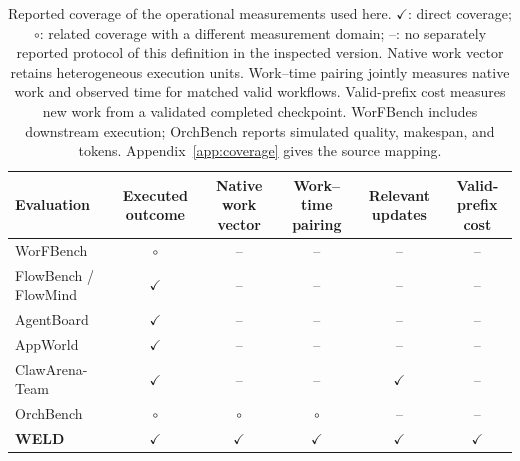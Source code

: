 \begin{table}[t]
\centering\small
\setlength{\tabcolsep}{3pt}
\begin{tabular}{lccccc}
\toprule
Evaluation & Executed outcome & Native work vector & Work--time pairing & Relevant updates & Valid-prefix cost\\
\midrule
WorFBench & $\circ$ & -- & -- & -- & --\\
FlowBench / FlowMind & $\checkmark$ & -- & -- & -- & --\\
AgentBoard & $\checkmark$ & -- & -- & -- & --\\
AppWorld & $\checkmark$ & -- & -- & -- & --\\
ClawArena-Team & $\checkmark$ & -- & -- & $\checkmark$ & --\\
OrchBench & $\circ$ & $\circ$ & $\circ$ & -- & --\\
\textbf{WELD} & $\checkmark$ & $\checkmark$ & $\checkmark$ & $\checkmark$ & $\checkmark$\\
\bottomrule
\end{tabular}
\caption{Reported coverage of the operational measurements used here. $\checkmark$: direct coverage; $\circ$: related coverage with a different measurement domain; --: no separately reported protocol of this definition in the inspected version. Native work vector retains heterogeneous execution units. Work--time pairing jointly measures native work and observed time for matched valid workflows. Valid-prefix cost measures new work from a validated completed checkpoint. WorFBench includes downstream execution; OrchBench reports simulated quality, makespan, and tokens. Appendix~\ref{app:coverage} gives the source mapping.}
\label{tab:coverage}
\end{table}
